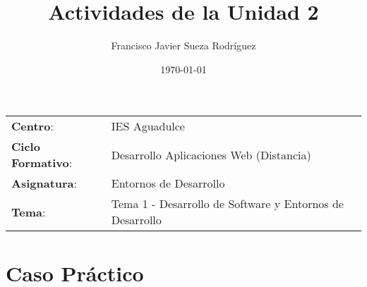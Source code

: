 


\title{
    \vspace{10ex}
    \normalfont \normalsize
    \huge \textbf{Actividades de la Unidad 2}
}
\author{Francisco Javier Sueza Rodríguez}
\date{\normalsize\today}



\maketitle

\thispagestyle{empty}

\vspace{75ex}

\begin{center}
    \begin{tabular}{l l}
        \textbf{Centro}: & IES Aguadulce \\
        \textbf{Ciclo Formativo}: & Desarrollo Aplicaciones Web (Distancia)\\
        \textbf{Asignatura}: & Entornos de Desarrollo\\
       \textbf{Tema}: & Tema 1 - Desarrollo de Software y Entornos de Desarrollo\\
    \end{tabular}
\end{center}

\newpage

\vspace{10ex}

\section{Caso Práctico}

\newpage



